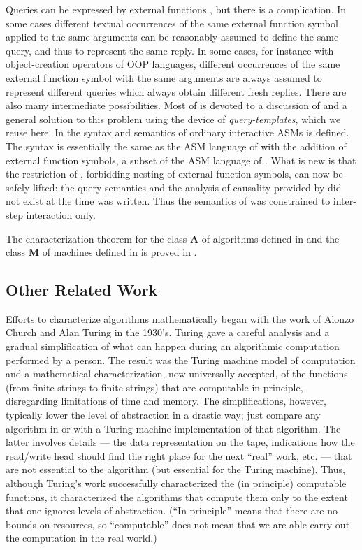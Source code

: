 \documentclass{LMCS}
\theoremstyle{definition}
\newcommand{\bld}[1]{\ensuremath{\mathbf {#1}}}
\begin{document}
Queries can be expressed by external functions \cite{lipari}, but there is
a complication.  In some cases different textual occurrences of the same
external function symbol applied to the same arguments can be reasonably
assumed to define the same query, and thus to represent the same reply. In
some cases, for instance with object-creation operators of OOP languages,
different occurrences of the same external function symbol with the same
arguments are always assumed to represent different queries which always
obtain different fresh replies. There are also many intermediate
possibilities. Most of \cite{oa2} is devoted to a discussion of and a
general solution to this problem using the device of
\emph{query-templates}, which we reuse here. In \cite{oa2} the syntax and
semantics of ordinary interactive ASMs is defined. The syntax is
essentially the same as the ASM language of \cite{seqth} with the addition
of external function symbols, a subset of the ASM language of
\cite{lipari}. What is new is that the restriction of \cite{lipari},
forbidding nesting of external function symbols, can now be safely lifted:
the query semantics and the analysis of causality provided by \cite{oa1}
did not exist at the time \cite{lipari} was written. Thus the semantics of
\cite{lipari} was constrained to inter-step interaction only.

The characterization theorem for the class \bld{A} of algorithms
defined in \cite{oa1} and the class \bld{M} of machines defined in
\cite{oa2} is proved in \cite{oa3}.

\subsection{Other Related Work}
\label{sec:other}

Efforts to characterize algorithms mathematically began with the work
of Alonzo Church \cite{church} and Alan Turing \cite{turing} in the
1930's.  Turing gave a careful analysis and a gradual simplification
of what can happen during an algorithmic computation performed by a
person.  The result was the Turing machine model of computation and a
mathematical characterization, now universally accepted, of the
functions (from finite strings to finite strings) that are computable
in principle, disregarding limitations of time and memory.  The
simplifications, however, typically lower the level of abstraction in
a drastic way; just compare any algorithm in \cite{alg-text1} or
\cite{alg-text2} with a Turing machine implementation of that
algorithm.  The latter involves details --- the data representation on
the tape, indications how the read/write head should find the right
place for the next ``real'' work, etc. --- that are not essential to
the algorithm (but essential for the Turing machine).  Thus, although
Turing's work successfully characterized the (in principle) computable
functions, it characterized the algorithms that compute them only to
the extent that one ignores levels of abstraction.  (``In principle''
means that there are no bounds on resources, so ``computable'' does
not mean that we are able carry out the computation in the real
world.)
\end{document}
